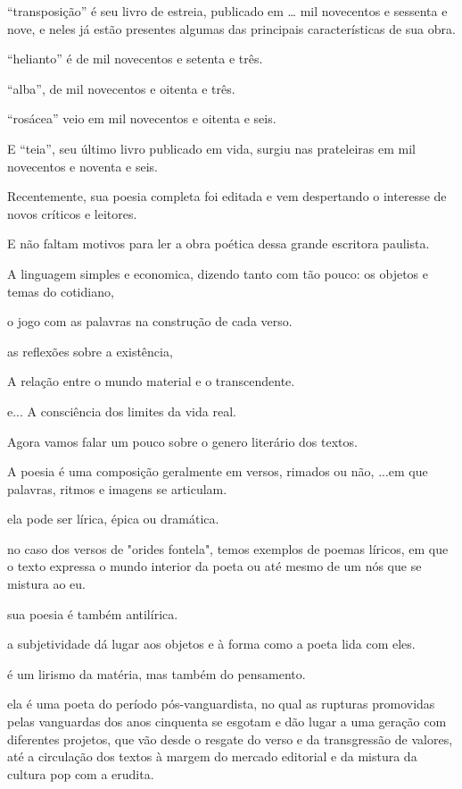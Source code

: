 \documentclass[12pt]{extarticle}
\begin{document}
“transposição” é seu livro de estreia, publicado em …
mil novecentos e sessenta e nove,    e 
neles já estão presentes algumas das principais características de sua obra.


“helianto” é de mil novecentos e setenta e três.


“alba”, de mil novecentos e oitenta e três.


“rosácea” veio em mil novecentos e oitenta e seis.


E “teia”, seu último livro publicado em vida, surgiu nas prateleiras em  mil novecentos e noventa e seis.


Recentemente, sua poesia completa foi editada e vem despertando o interesse de novos críticos e leitores.


E não faltam motivos para ler a obra poética dessa grande escritora paulista.


A linguagem simples e economica, dizendo  tanto com tão pouco:
os objetos e temas do cotidiano,

o jogo com as palavras na construção de cada verso.

as reflexões sobre a existência,


A relação entre o mundo material e o transcendente.

e... A consciência dos limites da vida real.


Agora vamos falar um pouco sobre o genero literário dos textos.



A poesia é uma composição geralmente em versos, rimados ou não, ...em que palavras, ritmos e imagens se articulam.

ela pode ser lírica, épica ou dramática.


no caso dos versos de "orides fontela", temos exemplos de poemas líricos, em que o texto expressa o mundo interior da poeta ou até mesmo de um nós que se mistura ao eu.

sua poesia é também antilírica.

a subjetividade dá lugar aos objetos e à forma como a poeta lida com eles.

é um lirismo da matéria, mas também do pensamento.


ela é uma poeta do período pós-vanguardista, no qual as rupturas promovidas pelas vanguardas dos anos cinquenta se esgotam e dão lugar a uma geração com diferentes projetos,
que vão desde o resgate do verso e da transgressão de valores,   até a circulação dos textos à margem do mercado editorial e da mistura da cultura pop com a erudita.
\end{document}
